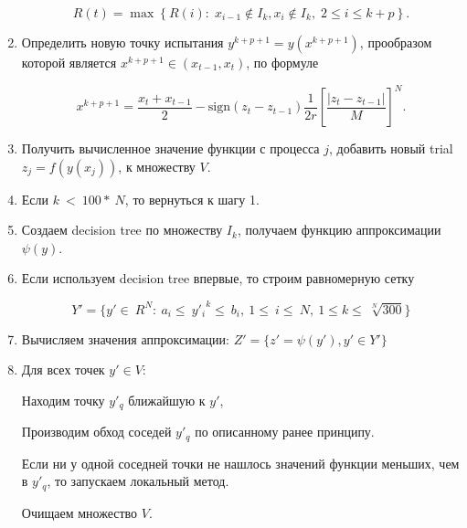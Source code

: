 \documentclass{svproc}
\begin{document}
\begin{enumerate}
\begin{displaymath}
R\left(t\right)=\max{\left\{R\left(i\right):\;x_{i-1}\notin I_k,x_i\notin I_k,\;2\le i\le k+p\right\}}.
\end{displaymath}

\item  Определить новую точку испытания $y^{k+p+1}=y\left(x^{k+p+1}\right)$, прообразом которой является $x^{k+p+1}\in\left(x_{t-1},x_t\right)$, по формуле

\begin{displaymath}
x^{k+p+1}=\frac{x_t+x_{t-1}}{2}-\mathrm{sign}\left(z_t-z_{t-1}\right)\frac{1}{2r}\left[\frac{\left|z_t-z_{t-1}\right|}{M}\right]^N.
\end{displaymath}

\item  Получить вычисленное  значение функции с процесса $j$, добавить новый trial $z_j = f(y(x_j))$, к множеству $V$. 



\item 	Если $ k\ <\ 100\ast\ N$, то вернуться к шагу 1.


\item Создаем decision tree по множеству $I_k$, получаем функцию аппроксимации  $\psi(y)$.



\item 	Если используем decision tree впервые, то строим равномерную сетку

\begin{displaymath}
Y'=\{ y'\in\ R^N:\ a_i\le\  {y'_i}^k \le\ b_i,\ 1\le\ i\le\ N,\ 1\le k\le\ \sqrt[N]{300}  \}
\end{displaymath}

\item 	Вычисляем значения аппроксимации: $Z' = \{ z'=  \psi(y'), y' \in Y'\}$

\item Для всех точек $y'\in V$:

Находим точку $y'_q$ ближайшую  к $y'$,

Производим обход соседей $y'_q$ по описанному ранее принципу.

Если ни у одной соседней точки не нашлось значений функции меньших, чем в $y'_q$, то запускаем локальный метод.

Очищаем множество $V$.


\end{enumerate}
\end{document}
